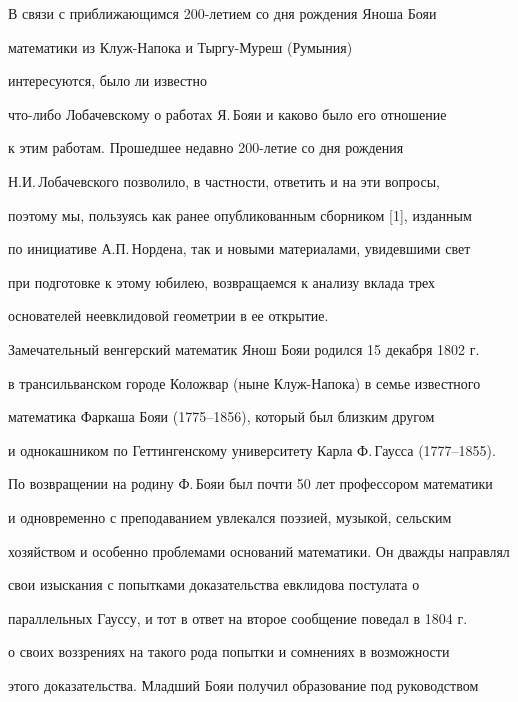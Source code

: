 \label{begin}











В связи с приближающимся 200-летием со дня рождения Яноша Бояи 


математики из Клуж-Напока и Тыргу-Муреш (Румыния) 


интересуются, было ли известно 


что-либо Лобачевскому о работах Я.\,Бояи и каково было его отношение 


к этим работам. Прошедшее недавно 200-летие со дня рождения 


Н.И.\,Лобачевского позволило, в частности, ответить и на эти вопросы, 


поэтому мы, пользуясь как ранее опубликованным сборником [1], изданным 


по инициативе А.П.\,Нордена, так и новыми материалами, увидевшими свет 


при подготовке к этому юбилею, возвращаемся к анализу вклада трех 


основателей неевклидовой геометрии в ее открытие.





Замечательный венгерский математик Янош Бояи родился 15 декабря 1802 г.


в трансильванском городе Коложвар (ныне Клуж-Напока) в семье известного 


математика Фаркаша Бояи (1775--1856), который был близким другом 


и однокашником по Геттингенскому университету Карла Ф.\,Гаусса (1777--1855). 


По возвращении на родину Ф.\,Бояи был почти 50 лет профессором математики 


и одновременно с преподаванием увлекался поэзией, музыкой, сельским 


хозяйством и особенно проблемами оснований математики. Он дважды направлял 


свои изыскания с попытками доказательства евклидова постулата о 


параллельных Гауссу, и тот в ответ на второе сообщение поведал в 1804 г. 


о своих воззрениях на такого рода попытки и сомнениях в возможности 


этого доказательства. Младший Бояи получил образование под руководством 


